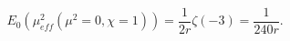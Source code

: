 \begin{equation}
E_{0}\left(\mu _{eff}^{2}\left(\mu ^{2}=0,\chi =1\right)\right)=\frac{1}{2r}\zeta \left(-3\right)=\frac{1}{240r}.\end{equation}


